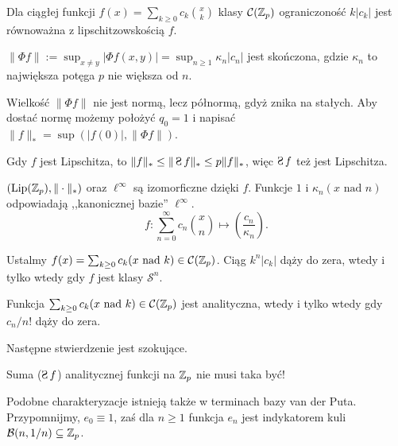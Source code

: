 \begin{fakt}
	Dla ciągłej funkcji $f(x) = \sum_{k \ge 0} c_k{x \choose k}$ klasy $\mathcal C(\mathbb Z_p)$ ograniczoność $k|c_k|$ jest równoważna z lipschitzowskością $f$.
\end{fakt}

\begin{wniosek}
	$\|\Phi f\| := \sup_{x \neq y} |\Phi f(x,y)| = \sup_{n \ge 1} \kappa_n |c_n|$ jest skończona, gdzie $\kappa_n$ to największa potęga $p$ nie większa od $n$.
\end{wniosek}

Wielkość $\|\Phi f\|$ nie jest normą, lecz półnormą, gdyż znika na stałych.
Aby dostać normę możemy położyć $q_0 = 1$ i napisać $\|f\|_* = \sup(|f(0)|, \|\Phi f\|)$.

\begin{wniosek}
	Gdy $f$ jest Lipschitza, to $\|f\|_* \le \|\suma f\|_* \le p \|f\|_*$, więc $\suma f$ też jest Lipschitza.
\end{wniosek}

\begin{wniosek}
	$(\textrm{Lip}(\mathbb Z_p), \|\cdot\|_*)$ oraz $\ell^\infty$ są izomorficzne dzięki $f$.
	Funkcje $1$ i $\kappa_n(x\textrm{ nad }n)$ odpowiadają ,,kanonicznej bazie'' $\ell^\infty$.
	\[
		f \colon \sum_{n=0}^\infty c_n {x \choose n} \mapsto \left( \frac{c_n}{\kappa_n}\right).
	\]
\end{wniosek}

\begin{fakt}
	Ustalmy $f(x) = \sum_{k\ge 0} c_k (x \mbox { nad } k) \in \mathcal C(\mathbb Z_p)$. 
	Ciąg $k^n |c_k|$ dąży do zera, wtedy i tylko wtedy gdy $f$ jest klasy $\mathcal S^n$.
\end{fakt}

\begin{fakt} %
	Funkcja $\sum_{k\ge 0} c_k (x \mbox { nad } k) \in \mathcal C(\mathbb Z_p)$ jest analityczna, wtedy i tylko wtedy gdy $c_n / n!$ dąży do zera.
\end{fakt}

Następne stwierdzenie jest szokujące.

\begin{przyklad}
	Suma ($\suma f$) analitycznej funkcji na $\mathbb Z_p$ nie musi taka być!
\end{przyklad}

Podobne charakteryzacje istnieją także w terminach bazy van der Puta.
Przypomnijmy, $e_0 \equiv 1$, zaś dla $n \ge 1$ funkcja $e_n$ jest indykatorem kuli $\mathcal B(n, 1/n) \subseteq \mathbb Z_p$.

